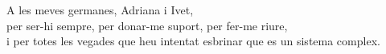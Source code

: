 \thispagestyle{empty}

\vspace*{8 cm}

\begin{flushright}
    \sffamily\large
    A les meves germanes, Adriana i Ivet,\\
    per ser-hi sempre, per donar-me suport, per fer-me riure, \\
    i per totes les vegades que heu intentat esbrinar que es un sistema complex.\\

\end{flushright}